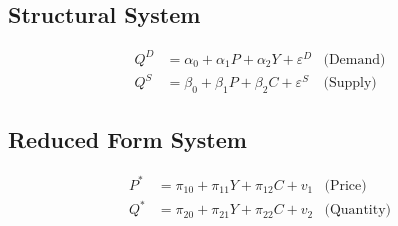 \documentclass[20pt]{extarticle}
\date{}
\begin{document}
\thispagestyle{empty}

\subsection*{Structural System}
\begin{align*}
Q^D &= \alpha_0 + \alpha_1 P + \alpha_2 Y + \varepsilon^D & \text{(Demand)} \\
Q^S &= \beta_0 + \beta_1 P + \beta_2 C + \varepsilon^S & \text{(Supply)}
\end{align*}

\bigskip
\bigskip
\bigskip
\bigskip
\bigskip

\subsection*{Reduced Form System}
\begin{align*}
P^* &= \pi_{10} + \pi_{11} Y + \pi_{12} C + v_1& \text{(Price)}  \\
Q^* &= \pi_{20} + \pi_{21} Y + \pi_{22} C + v_2& \text{(Quantity)}
\end{align*}
\end{document}
